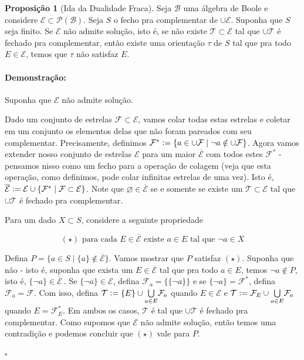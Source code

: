 \documentclass[11pt]{article}
\newcommand{\defeq}{\vcentcolon=}
\newcommand{\pulinho}{\vspace{.5cm}}
\theoremstyle{definition}
\theoremstyle{definition}
\theoremstyle{definition}
\newtheorem{prop}{Proposição}
\newenvironment{proposicao}{
\definecolor{shadecolor}{HTML}{FFDBDF}
\begin{shaded}
\begin{prop}
}
{
\end{prop}
\end{shaded}
}
\theoremstyle{definition}
\theoremstyle{definition}
\theoremstyle{definition}
\theoremstyle{definition}
\theoremstyle{definition}
\theoremstyle{definition}
\theoremstyle{definition}
\theoremstyle{definition}
\theoremstyle{definition}
\newenvironment{prova}{\paragraph{Demonstração:}}{\hfill$\square$ 
\pulinho
}
\theoremstyle{definition}
\theoremstyle{definition}
\begin{document}
\begin{proposicao}[Ida da Dualidade Fraca]
  Seja $\mathcal{B}$ uma álgebra de Boole e considere $\mathcal{E} \subset \mathcal{P}(\mathcal{B})$. Seja $S$ o fecho pra complementar de $\cup \mathcal{E}$. Suponha que $S$ seja finito. Se $\mathcal{E}$ não admite solução, isto é, se não existe $\mathcal{T} \subset \mathcal{E}$ tal que $\cup \mathcal{T}$ é fechado pra complementar, então existe uma orientação $\tau$ de $S$ tal que pra todo $E \in \mathcal{E}$, temos que $\tau$ não satisfaz $E$.
\end{proposicao}
\begin{prova}
Suponha que $\mathcal{E}$ não admite solução.

Dado um conjunto de estrelas $\mathcal{F} \subset \mathcal{E}$, vamos colar todas estas estrelas e coletar em um conjunto os elementos delas que não foram pareados com seu complementar. Precisamente, definimos $ \mathcal{F}^* \defeq \{a \in \cup \mathcal{F} \mid \lnot a \notin \cup \mathcal{F}\}$. Agora vamos extender nosso conjunto de estrelas $\mathcal{E}$ para um maior $\overline{\mathcal{E}}$ com todos estes $\mathcal{F}^*$ - pensamos nisso como um fecho para a operação de colagem (veja que esta operação, como definimos, pode colar infinitas estrelas de uma vez). Isto é, $\overline{\mathcal{E}} \defeq \mathcal{E} \cup \{\mathcal{F}^* \mid \mathcal{F} \subset \mathcal{E}\}$.  Note que $\varnothing \in \overline{\mathcal{E}}$ se e somente se existe um $\mathcal{T} \subset \mathcal{E}$ tal que $\cup \mathcal{T}$ é fechado pra complementar. 

Para um dado $X \subset S$, considere a seguinte propriedade

\[
(\star) \text{ para cada } E \in \overline{\mathcal{E}}\text{ existe } a \in E \text{ tal que } \lnot a \in X
\]

Defina $P = \{a \in S \mid \{a\} \notin \overline{\mathcal{E}}\}$. Vamos mostrar que $P$ satisfaz $(\star)$. Suponha que não - isto é, suponha que exista um $E \in \overline{\mathcal{E}}$ tal que pra todo $a \in E$, temos $\lnot a \notin P$, isto é, $\{\lnot a\} \in \overline{\mathcal{E}}\ $. Se $\{\lnot a\} \in \mathcal{E}$, defina $\mathcal{F}_a = \{\{\lnot a\}\}$ e se $\{\lnot a\} = \mathcal{F}^*$, defina $\mathcal{F}_a = \mathcal{F}$. Com isso, defina $\mathcal{T} \defeq \{E\} \cup \underset{a \in E}{\bigcup} \mathcal{F}_a$ quando $E \in \mathcal{E}$ e $\mathcal{T} \defeq \mathcal{F}_E \cup \underset{a \in E}{\bigcup} \mathcal{F}_a$ quando $E = \mathcal{F}_E^*$. Em ambos os casos, $\mathcal{T}$ é tal que $\cup \mathcal{T}$ é fechado pra complementar. Como supomos que $\mathcal{E}$ não admite solução, então temos uma contradição e podemos concluir que $(\star)$ vale para $P$.


\end{prova}
\end{document}
